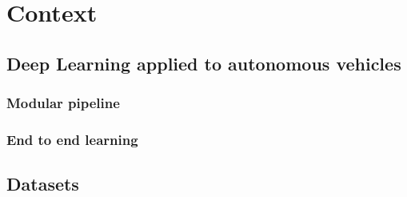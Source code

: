 
\chapter{Context}

\label{Context} 


\section{Deep Learning applied to autonomous vehicles}

\subsection{Modular pipeline}

\subsection{End to end learning}



\lipsum[1]

\section{Datasets}



\lipsum[2]
